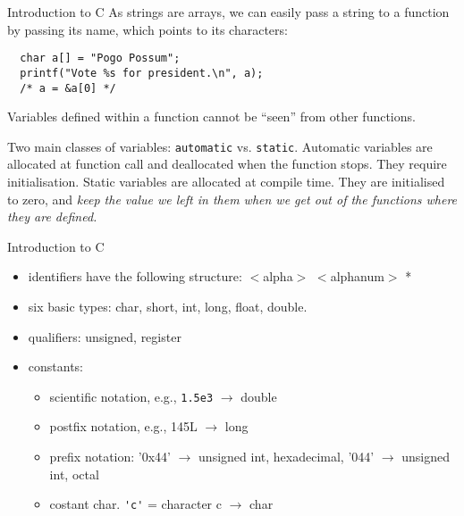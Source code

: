 \begin{frame}[fragile]{Introduction to C}
As strings are arrays, we can easily pass a string to a function
by passing its name, which points to its characters:


\vspace{20pt}

\begin{verbatim}
  char a[] = "Pogo Possum";
  printf("Vote %s for president.\n", a);
  /* a = &a[0] */
\end{verbatim}


Variables defined within a function cannot be ``seen'' from other functions.

\vspace{20pt}


Two main classes of variables: {\tt automatic} vs. {\tt static}. Automatic variables
are allocated at function call and deallocated when the function stops.
They require initialisation. Static variables are allocated at compile time.
They are initialised to zero, and \emph{keep the value we left in them
when we get out of the functions where they are defined.}


\end{frame}
\begin{frame}[fragile]{Introduction to C}
\begin{itemize}
\item identifiers have the following structure:
      $<$alpha$>$ { $<$alphanum$>$ }*
\item six basic types: char, short, int, long, float, double.
\item qualifiers: unsigned, register
\item constants:
    \begin{itemize}
    \item scientific notation, e.g., {\tt 1.5e3} $\rightarrow$ double
    \item postfix notation, e.g., 145L $\rightarrow$ long
    \item prefix notation: '0x44' $\rightarrow$ unsigned int, hexadecimal, '044'
          $\rightarrow$ unsigned int, octal
    \item costant char. \verb"'c'" = character c  $\rightarrow$ char
\end{itemize}
\end{itemize}

\end{frame}
